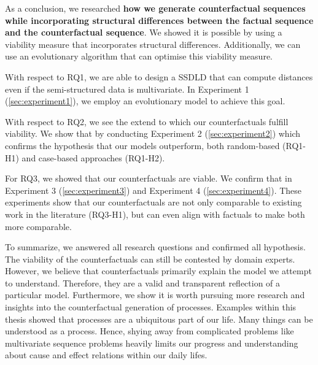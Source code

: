 \documentclass[./../../paper.tex]{subfiles}
\begin{document}
As a conclusion, we researched \textbf{how we generate counterfactual sequences while incorporating structural differences between the factual sequence and the counterfactual sequence}. We showed it is possible by using a viability measure that incorporates structural differences. Additionally, we can use an evolutionary algorithm that can optimise this viability measure. 

With respect to RQ1\footnotemark[1], we are able to design a \Gls{SSDLD} that can compute distances even if the semi-structured data is multivariate. In Experiment 1 (\autoref{sec:experiment1}), we employ an evolutionary model to achieve this goal.

With respect to RQ2\footnotemark[2], we see the extend to which our counterfactuals fulfill viability. 
We show that by conducting Experiment 2 (\autoref{sec:experiment2}) which confirms the hypothesis that our models outperform, both random-based (RQ1-H1) and case-based approaches (RQ1-H2).  

For RQ3\footnotemark[3], we showed that our counterfactuals are viable. 
We confirm that in Experiment 3 (\autoref{sec:experiment3}) and Experiment 4 (\autoref{sec:experiment4}).
These experiments show that our counterfactuals are not only comparable to existing work in the literature (RQ3-H1), but can even align with factuals to make both more comparable.

To summarize, we answered all research questions and confirmed all hypothesis. The viability of the counterfactuals can still be contested by domain experts. However, we believe that counterfactuals primarily explain the model we attempt to understand. Therefore, they are a valid and transparent reflection of a particular model. Furthermore, we show it is worth pursuing more research and insights into the counterfactual generation of processes. Examples within this thesis showed that processes are a ubiquitous part of our life. Many things can be understood as a process. Hence, shying away from complicated problems like multivariate sequence problems heavily limits our progress and understanding about cause and effect relations within our daily lifes. 

\end{document}
